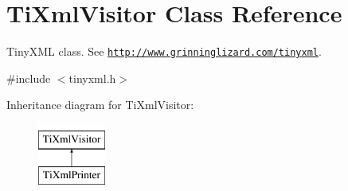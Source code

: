 \hypertarget{class_ti_xml_visitor}{}\section{Ti\+Xml\+Visitor Class Reference}
\label{class_ti_xml_visitor}


Tiny\+X\+ML class. See \href{http://www.grinninglizard.com/tinyxml}{\tt http\+://www.\+grinninglizard.\+com/tinyxml}.  




{\ttfamily \#include $<$tinyxml.\+h$>$}

Inheritance diagram for Ti\+Xml\+Visitor\+:\begin{figure}[H]
\begin{center}
\leavevmode
\includegraphics[height=2.000000cm]{class_ti_xml_visitor}
\end{center}
\end{figure}

